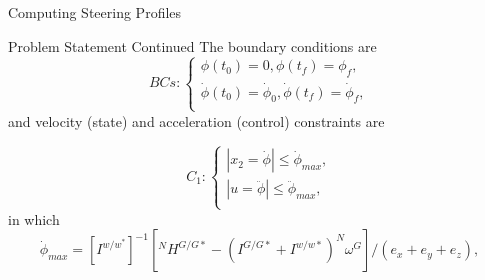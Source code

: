 \documentclass{beamer}
\begin{document}
\begin{frame}{Computing Steering Profiles}
\begin{block}{ Problem Statement Continued}
The boundary conditions are
\begin{equation}\label{Bcs}
 BCs:\left\{
                \begin{array}{l}
                \phi(t_0)=0, \phi(t_f)=\phi_{f},\\
               \dot{\phi}(t_0)=\dot{\phi}_{0},\dot{ \phi}(t_f)=\dot{\phi}_{f}, \\
                \end{array}
              \right.
 \end{equation}
and velocity (state) and acceleration (control) constraints are

\begin{equation}\label{constraints1}
 C_1:\left\{
                \begin{array}{l}
               |x_2=\dot{\phi}|\leq \dot{\phi}_{max},\\
              |u=\ddot{\phi}|\leq \ddot{\phi}_{max},\\
                \end{array}
              \right.
 \end{equation}
in which
\begin{equation}
\dot{\phi}_{max}=[I^{w/w^*}]^{-1}[^NH^{G/G*}-(I^{G/G*}+I^{w/w*})^N\omega^G]/(e_x+e_y+e_z),
\end{equation}


\end{block}
\end{frame}
\end{document}
